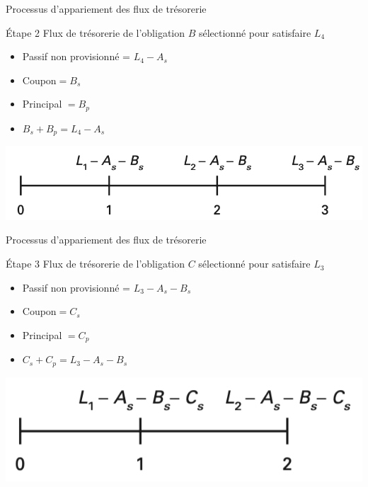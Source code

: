 \documentclass{beamer}
\begin{document}
\begin{frame}{Processus d'appariement des flux de trésorerie}
\begin{block}{Étape 2}
Flux de trésorerie de l'obligation $B$ sélectionné pour satisfaire $L_4$
\begin{itemize}[label=\bullet]
\item Passif non provisionné = $L_4 - A_s$
\item Coupon$=B_s$ 
\item Principal $=B_p$
\item $B_s+B_p=L_4 - A_s$
\end{itemize}
\end{block}
\includegraphics[scale=.5]{3}
\end{frame}


\begin{frame}{Processus d'appariement des flux de trésorerie}
\begin{block}{Étape 3}
Flux de trésorerie de l'obligation $C$ sélectionné pour satisfaire $L_3$
\begin{itemize}[label=\bullet]
\item Passif non provisionné = $L_3 - A_s-B_s$
\item Coupon$=C_s$ 
\item Principal $=C_p$
\item $C_s+C_p=L_3 - A_s-B_s$
\end{itemize}
\end{block}
\includegraphics[scale=.5]{4}
\end{frame}
\end{document}
